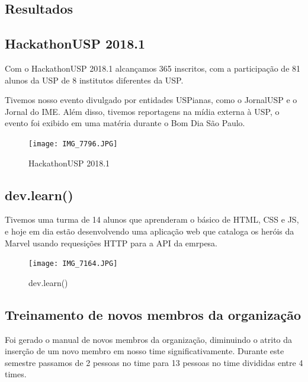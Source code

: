 \documentclass[a0,portrait]{a0poster}
\begin{document}
\begin{multicols}{2}
\begin{tcolorbox}[ breakable,
                   coltext=white,
                   colback=DeepOrange,
                   colframe=DeepOrange,
                   width=36cm,
                   top=0.3cm,
                   bottom=0.4cm,
                   enlarge left by=-6mm]
\section*{Resultados}
\end{tcolorbox}

\subsection*{HackathonUSP 2018.1}
Com o HackathonUSP 2018.1 alcançamos 365 inscritos, com a participação de 81 alunos da USP de
8 institutos diferentes da USP.

Tivemos nosso evento divulgado por entidades USPianas, como o JornalUSP e o Jornal do IME. Além
disso, tivemos reportagens na mídia externa à USP, o evento foi exibido em uma matéria durante
o Bom Dia São Paulo.

\begin{figure}[H]
    \centering
    \texttt{[image: IMG\_7796.JPG]}
    \caption{HackathonUSP 2018.1}
\end{figure}

\subsection*{dev.learn()}
Tivemos uma turma de 14 alunos que aprenderam o básico de HTML, CSS e JS, e hoje em dia estão
desenvolvendo uma aplicação web que cataloga os heróis da Marvel usando requesições HTTP para a
API da emrpesa.

\begin{figure}[H]
    \centering
    \texttt{[image: IMG\_7164.JPG]}
    \caption{dev.learn()}
\end{figure}

\subsection*{Treinamento de novos membros da organização}
Foi gerado o manual de novos membros da organização, diminuindo o atrito da inserção de um novo 
membro em nosso time significativamente.
Durante este semestre passamos de 2 pessoas no time para 13 pessoas no time divididas entre
4 times.


\end{multicols}
\end{document}
